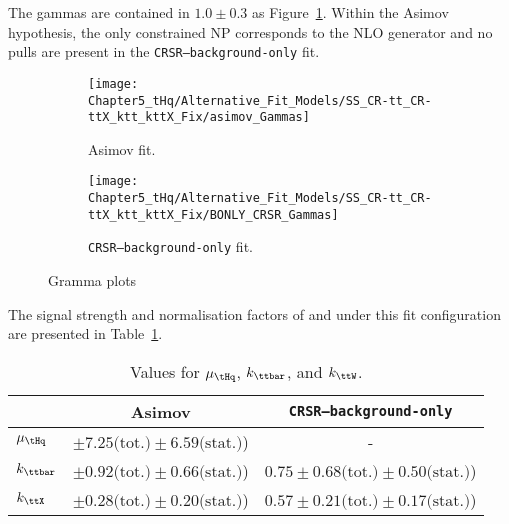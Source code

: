 The gammas are contained in $1.0 \pm0.3$ as Figure~\ref{fig:Alternative:SS:twoCRs_kttX_kttbar_fixed:gammas}.
Within the Asimov hypothesis, the only constrained NP corresponds to the \ttbar NLO generator and no pulls are present in the \texttt{CRSR--background-only} fit.

\begin{figure}[h]
\centering
\begin{subfigure}{.35\textwidth}
  \centering
  \texttt{[image: Chapter5\_tHq/Alternative\_Fit\_Models/SS\_CR-tt\_CR-ttX\_ktt\_kttX\_Fix/asimov\_Gammas]}
  \caption{Asimov fit.}
\end{subfigure}%
\begin{subfigure}{.35\textwidth}
  \centering
  \texttt{[image: Chapter5\_tHq/Alternative\_Fit\_Models/SS\_CR-tt\_CR-ttX\_ktt\_kttX\_Fix/BONLY\_CRSR\_Gammas]}
  \caption{\texttt{CRSR--background-only} fit.}
\end{subfigure}
\caption{Gramma plots}
\label{fig:Alternative:SS:twoCRs_kttX_kttbar_fixed:gammas}
\end{figure}

The signal strength and normalisation factors of \ttbar and \ttX under this fit configuration are 
presented in Table~\ref{tab:Alternative:SS:twoCRs_kttX_kttbar_fixed:results}. 

\begin{table}[h]
\centering
\begin{tabular}{l|c|c}
\cline{2-3}
            		&   Asimov								&  \texttt{CRSR--background-only}       			\\ \midrule
$\mu_{\tHq}$ 	&  $\pm 7.25\text{(tot.)} \pm 6.59\text{(stat.)}$)        	&        -        \\
$k_{\ttbar}$	&  $\pm 0.92\text{(tot.)} \pm 0.66\text{(stat.)}$) 		&  $0.75\pm 0.68\text{(tot.)} \pm 0.50\text{(stat.)}$)  \\
$k_{\ttX}$ 		&  $\pm 0.28\text{(tot.)} \pm 0.20\text{(stat.)}$)		&  $0.57\pm 0.21\text{(tot.)} \pm 0.17\text{(stat.)}$)        \\ \bottomrule
\end{tabular}
\caption{Values for $\mu_{\tHq}$, $k_{\ttbar}$, and $k_{\ttW}$.}
\label{tab:Alternative:SS:twoCRs_kttX_kttbar_fixed:results} 
\end{table}





